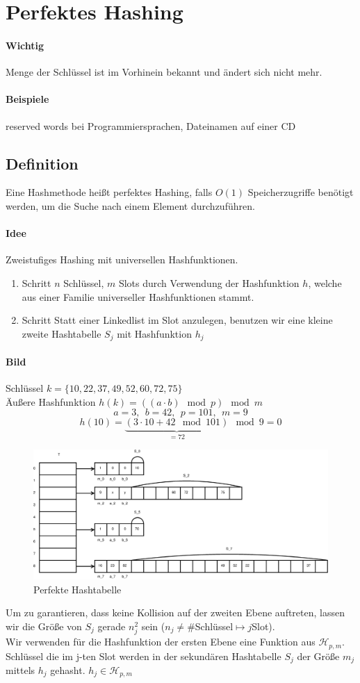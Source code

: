 \section{Perfektes Hashing}
\paragraph{Wichtig}
Menge der Schlüssel ist im Vorhinein bekannt und ändert sich nicht mehr.
\paragraph{Beispiele}
reserved words bei Programmiersprachen, Dateinamen auf einer CD
\subsection{Definition}
Eine Hashmethode heißt perfektes Hashing, falls $O(1)$ Speicherzugriffe benötigt werden, um die Suche nach einem Element durchzuführen.
\paragraph{Idee}
Zweistufiges Hashing mit universellen Hashfunktionen.
\begin{enumerate}
	\item Schritt  $n$ Schlüssel, $m$ Slots durch Verwendung der Hashfunktion $h$, welche aus einer Familie universeller Hashfunktionen stammt.
	\item Schritt  Statt einer Linkedlist im Slot anzulegen, benutzen wir eine kleine zweite Hashtabelle $S_j$ mit Hashfunktion $h_j$
\end{enumerate}
\paragraph{Bild} Schlüssel $k=\{ 10, 22, 37, 49, 52, 60, 72, 75 \}$\\
Äußere Hashfunktion $h(k)=((a\cdot b) \mod{p})\mod{m}$
\[ a=3,~~b=42,~~p=101,~~m=9 \]
\[ h(10)= \underset{=72}{ \underbrace{ (3\cdot 10+42\mod101) } }\mod{9}=0 \]
\begin{figure}[h]
\centering
\includegraphics[width=0.7\linewidth]{14/Grafik/Hashing}
\caption{Perfekte Hashtabelle}
\label{fig:Hashing}
\end{figure}
Um zu garantieren, dass keine Kollision auf der zweiten Ebene auftreten, lassen wir die Größe von $S_j$ gerade $n_j^2$ sein ($n_j\neq \#$Schlüssel$\mapsto j$Slot).\\
Wir verwenden für die Hashfunktion der ersten Ebene eine Funktion aus $\mathcal{H}_{p,m}$. Schlüssel die im j-ten Slot werden in der sekundären Hashtabelle $S_j$ der Größe $m_j$ mittels $h_j$ gehasht.  $h_j\in\mathcal{H}_{p,m}$
